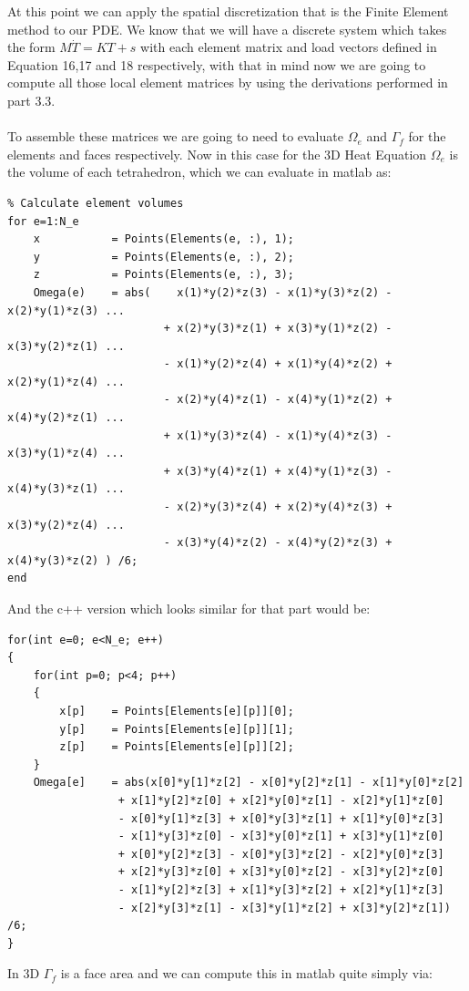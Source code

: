 \documentclass[12pt]{article}
\begin{document}
At this point we can apply the spatial discretization that is the Finite Element method to our PDE. We know that we will have a discrete system which takes the form $M\dot{T} = KT + s$ with each element matrix and load vectors defined in Equation 16,17 and 18 respectively, with that in mind now we are going to compute all those local element matrices by using the derivations performed in part 3.3.
\\\\
To assemble these matrices we are going to need to evaluate $\Omega_e$ and $\Gamma_f$ for the elements and faces respectively. Now in this case for the 3D Heat Equation $\Omega_e$ is the volume of each tetrahedron, which we can evaluate in matlab as:

\begin{lstlisting}
% Calculate element volumes
for e=1:N_e	
	x           = Points(Elements(e, :), 1);
	y           = Points(Elements(e, :), 2);
	z           = Points(Elements(e, :), 3);
	Omega(e)	= abs(    x(1)*y(2)*z(3) - x(1)*y(3)*z(2) - x(2)*y(1)*z(3) ...
						+ x(2)*y(3)*z(1) + x(3)*y(1)*z(2) - x(3)*y(2)*z(1) ...
						- x(1)*y(2)*z(4) + x(1)*y(4)*z(2) + x(2)*y(1)*z(4) ...
						- x(2)*y(4)*z(1) - x(4)*y(1)*z(2) + x(4)*y(2)*z(1) ...
						+ x(1)*y(3)*z(4) - x(1)*y(4)*z(3) - x(3)*y(1)*z(4) ...
						+ x(3)*y(4)*z(1) + x(4)*y(1)*z(3) - x(4)*y(3)*z(1) ...
						- x(2)*y(3)*z(4) + x(2)*y(4)*z(3) + x(3)*y(2)*z(4) ...
						- x(3)*y(4)*z(2) - x(4)*y(2)*z(3) + x(4)*y(3)*z(2) ) /6;
end
\end{lstlisting}

And the c++ version which looks similar for that part would be:

\begin{lstlisting}[style=MyC++Style]
for(int e=0; e<N_e; e++)
{
	for(int p=0; p<4; p++)
	{
		x[p]	= Points[Elements[e][p]][0];
		y[p]	= Points[Elements[e][p]][1];
		z[p]	= Points[Elements[e][p]][2];
	}
	Omega[e]    = abs(x[0]*y[1]*z[2] - x[0]*y[2]*z[1] - x[1]*y[0]*z[2]
				 + x[1]*y[2]*z[0] + x[2]*y[0]*z[1] - x[2]*y[1]*z[0]
				 - x[0]*y[1]*z[3] + x[0]*y[3]*z[1] + x[1]*y[0]*z[3]
				 - x[1]*y[3]*z[0] - x[3]*y[0]*z[1] + x[3]*y[1]*z[0]
				 + x[0]*y[2]*z[3] - x[0]*y[3]*z[2] - x[2]*y[0]*z[3]
				 + x[2]*y[3]*z[0] + x[3]*y[0]*z[2] - x[3]*y[2]*z[0]
				 - x[1]*y[2]*z[3] + x[1]*y[3]*z[2] + x[2]*y[1]*z[3]
				 - x[2]*y[3]*z[1] - x[3]*y[1]*z[2] + x[3]*y[2]*z[1]) /6;
}
\end{lstlisting}

In 3D $\Gamma_f$ is a face area and we can compute this in matlab quite simply via:
\end{document}
